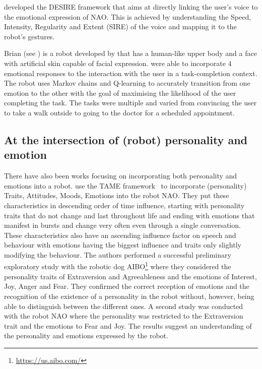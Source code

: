 \documentclass[nomenclature, english, biblatex]{kththesis}
\begin{document}
\textcite{desire} developed the DESIRE framework that aims at directly linking the user's voice to the emotional expression of NAO. This is achieved by understanding the Speed, Intensity, Regularity and Extent (SIRE) of the voice and mapping it to the robot's gestures. 

Brian (see ) is a robot developed by \textcite{brian} that has a human-like upper body and a face with artificial skin capable of facial expression. \textcite{brianEmotions} were able to incorporate 4 emotional responses to the interaction with the user in a task-completion context. The robot uses Markov chains and Q-learning to accurately transition from one emotion to the other with the goal of maximising the likelihood of the user completing the task. The tasks were multiple and varied from convincing the user to take a walk outside to going to the doctor for a scheduled appointment.

\subsection{At the intersection of (robot) personality and emotion}
There have also been works focusing on incorporating both personality and emotions into a robot. \textcite{moshkina2011tame} use the TAME framework~\cite{tame0, tame1} to incorporate (personality) Traits, Attitudes, Moods, Emotions into the robot NAO. They put these characteristics in descending order of time influence, starting with personality traits that do not change and last throughout life and ending with emotions that manifest in bursts and change very often even through a single conversation. These characteristics also have an ascending influence factor on speech and behaviour with emotions having the biggest influence and traits only slightly modifying the behaviour. The authors performed a successful preliminary exploratory
study with the robotic dog AIBO\footnote{\url{https://us.aibo.com/}} where they considered the personality traits of Extraversion and
Agreeableness and the emotions of Interest, Joy, Anger and Fear. They confirmed the correct reception of emotions and the recognition of the existence of a personality in the robot without, however, being able to distinguish between the different ones. A second study was conducted with the robot NAO where the personality was restricted to the Extraversion trait and the emotions to Fear and Joy. The results suggest an understanding of the personality and emotions expressed by the robot.
\end{document}
